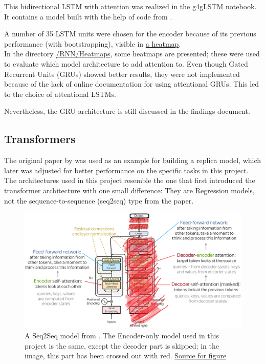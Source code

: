 \documentclass{article}
\begin{document}
This bidirectional LSTM with attention was realized in \href{https://github.com/AntonStantan/matura/blob/main/attentional-RNN/g4gLSTM.ipynb}{the g4gLSTM notebook}. It contains a model built with the help of code from \cite{geeksforgeeks_attention_bilstm}.

A number of 35 LSTM units were chosen for the encoder because of its previous performance (with bootstrapping), visible in \href{https://github.com/AntonStantan/matura/blob/main/attentional-RNN/previousHeatmap.png}{a heatmap}.
\\[2em]
In the directory \href{https://github.com/AntonStantan/matura/tree/main/RNN/Heatmaps}{/RNN/Heatmaps}, some heatmaps are presented; these were used to evaluate which model architecture to add attention to. Even though Gated Recurrent Units (GRUs) showed better results, they were not implemented because of the lack of online documentation for using attentional GRUs. This led to the choice of attentional LSTMs.

Nevertheless, the GRU architecture is still discussed in the findings document.

\newpage
\subsection{Transformers}

The original paper by \cite{vaswani2023attentionneed} was used as an example for building a replica model, which later was adjusted for better performance on the specific tasks in this project. The architectures used in this project resemble the one that first introduced the transformer architecture with one small difference: They are Regression models, not the sequence-to-sequence (seq2seq) type from the paper.



\begin{figure}[htbp]
    \centering
    \includegraphics[width=0.5\paperwidth]{images/transformerSeq2Seq.png}
    \caption{A Seq2Seq model from \cite{vaswani2023attentionneed}. The 
    Encoder-only model used in this project is the same, except the decoder 
    part is skipped; in the image, this part has been crossed out with red. \href{https://www.cloud.studio/ai-llm-how-do-llms-work}{Source for figure}}
    \label{fig:transformerSeq2Seq}
\end{figure}
\end{document}
